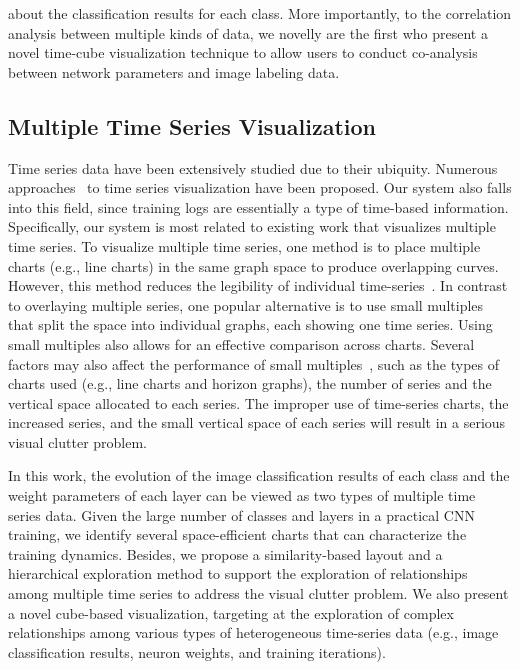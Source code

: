\documentclass[format=acmsmall, review=false, screen=true]{acmart}
\begin{document}
{about the classification results for each class. More importantly, to the correlation analysis between multiple kinds of data, we novelly are the first who present a novel time-cube visualization technique to allow users to conduct co-analysis between network parameters and image labeling data.}\subsection{Multiple Time Series Visualization}

Time series data have been extensively studied due to their ubiquity.
Numerous approaches~\cite{aigner2011visualization, aigner2008visual, bach2014review} to time series visualization have been proposed.
Our system also falls into this field, since training logs are essentially a type of time-based information.
Specifically, our system is most related to existing work that visualizes multiple time series.
To visualize multiple time series, one method is to place multiple charts (e.g., line charts) in the same graph space to produce overlapping curves. However, this method reduces the legibility of individual time-series~\cite{javed2010graphical}.
In contrast to overlaying multiple series, one popular alternative is to use small multiples~\cite{tufte1983visual} that split the space into individual graphs, each showing one time series. Using small multiples also allows for an effective comparison across charts. Several factors may also affect the performance of small multiples~\cite{heer2009sizing,javed2010graphical}, such as the types of charts used (e.g., line charts and horizon graphs), the number of series and the vertical space allocated to each series. The improper use of time-series charts, the increased series, and the small vertical space of each series will result in a serious visual clutter problem.

In this work, the evolution of the image classification results of each class and the weight parameters of each layer can be viewed as two types of multiple time series data. Given the large number of classes and layers in a practical CNN training, we identify several space-efficient charts that can characterize the training dynamics. Besides, we propose a similarity-based layout and a hierarchical exploration method to support the exploration of relationships among multiple time series to address the visual clutter problem. We also present a novel cube-based visualization, targeting at the exploration of complex relationships among various types of heterogeneous time-series data (e.g., image classification results, neuron weights, and training iterations).
\end{document}
